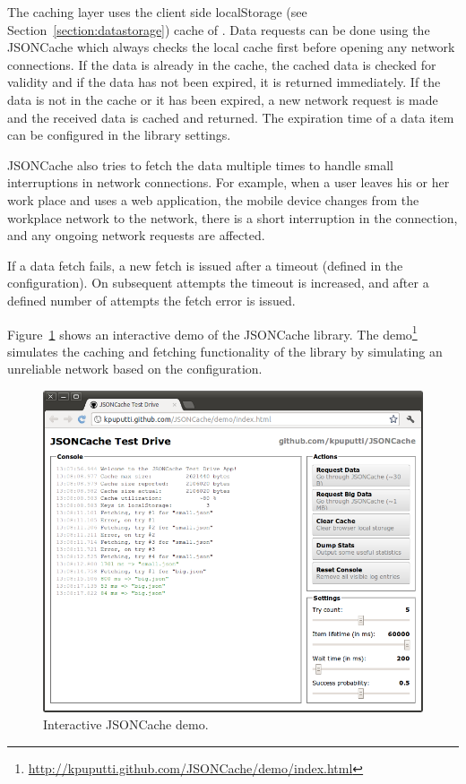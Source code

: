 The caching layer uses the client side localStorage (see
Section~\ref{section:datastorage}) cache of . Data
requests can be done using the JSONCache  which always
checks the local cache first before opening any network
connections. If the data is already in the cache, the cached data is
checked for validity and if the data has not been expired, it is
returned immediately. If the data is not in the cache or it has been
expired, a new network request is made and the received data is cached
and returned. The expiration time of a data item can be configured in
the library settings.

JSONCache also tries to fetch the data multiple times to handle small
interruptions in network connections.  For example, when a user leaves
his or her work place and uses a web application, the mobile device
changes from the workplace  network to the 
network, there is a short interruption in the connection, and any
ongoing network requests are affected.

If a data fetch fails, a new fetch is issued after a timeout (defined
in the configuration). On subsequent attempts the timeout is
increased, and after a defined number of attempts the fetch error is
issued.

Figure~\ref{figure:jsoncache-demo.png} shows an interactive demo of
the JSONCache library. The
demo\footnote{\url{http://kpuputti.github.com/JSONCache/demo/index.html}}
simulates the caching and fetching functionality of the library by
simulating an unreliable network based on the configuration.

\begin{figure}[ht]
  \begin{center}
    \includegraphics[width=\textwidth]{images/jsoncache-demo.png}
    \caption{Interactive JSONCache demo.}
    \label{figure:jsoncache-demo.png}
  \end{center}
\end{figure}

